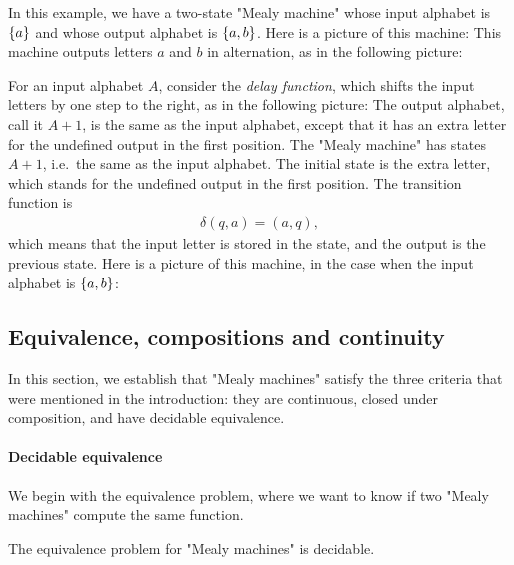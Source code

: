 \begin{myexample}\label{ex:alternating-a-b} In this example, we have a two-state "Mealy machine" whose input alphabet is $\{a\}$ and whose output alphabet is $\{a,b\}$. Here is a picture of this machine:
    This machine outputs letters $a$ and $b$ in alternation, as in the following picture:
\end{myexample}


\begin{myexample}[Delay]\label{ex:delay}
    For an input alphabet $A$, consider the \emph{delay function}, which shifts the input letters by one step to the right, as in the following picture: 
    The output alphabet, call it $A+1$,  is the same as the input alphabet, except that it has an extra letter for the undefined output in the first position. The "Mealy machine" has states $A+1$, i.e.~the same as the input alphabet. The initial state is the extra letter, which stands for the undefined output in the first position. The transition function  is 
    \begin{align*}
    \delta(q,a)  = (a,q),
    \end{align*}
which means that  the input letter is stored in the state, and the output is the previous state. Here is a picture of this machine, in the case when the input alphabet is $\{a,b\}$:
\end{myexample}

\subsection{Equivalence, compositions and continuity}
\label{sec:properties-mealy}
In this section, we establish that "Mealy machines" satisfy the three criteria that were mentioned in the introduction: they are continuous, closed under composition, and have decidable equivalence.

\paragraph*{Decidable equivalence} We begin with the equivalence problem, where we want to know if two "Mealy machines" compute the same function.

\begin{theorem}\label{thm:equivalence-decidable-mealy}
    The equivalence problem for "Mealy machines" is decidable.
\end{theorem}


